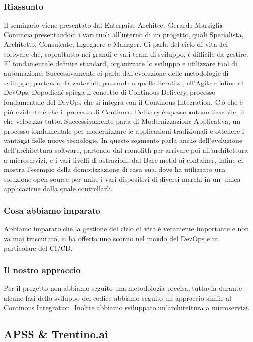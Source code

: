 \documentclass{report}
\begin{document}
\subsubsection*{Riassunto}
Il seminario viene presentato dal Enterprise Architect Gerardo Marsiglia
Comincia presentandoci i vari ruoli all'interno di un progetto, quali Specialista, Architetto, Consulente, Ingegnere e Manager.
Ci parla del ciclo di vita del software che, soprattutto nei grandi e vari team di sviluppo, è difficile da gestire. E' fondamentale definire standard, organizzare lo sviluppo e utilizzare tool di automazione.
Successivamente ci parla dell'evoluzione delle metodologie di sviluppo, partendo da waterfall, passando a quelle iterative, all'Agile e infine al DevOps.
Dopodichè spiega il concetto di Continous Delivery, processo fondamentale del DevOps che si integra con il Continous Integration. 
Ciò che è più evidente è che il processo di Continous Delivery è spesso automatizzabile, il che velocizza tutto.
Successivamente parla di Modernizzazione Applicativa, un processo fondamentale per modernizzare le applicazioni tradizionali e ottenere i vantaggi delle nuove tecnologie.
In questo segmento parla anche dell'evoluzione dell'architettura software, partendo dal monolith per arrivare poi all'architettura a microservizi, e i vari livelli di astrazione dal Bare metal ai container.
Infine ci mostra l'esempio della domotizzazione di casa sua, dove ha utilizzato una soluzione open source per unire i vari dispositivi di diversi marchi in un' unica applicazione dalla quale controllarli.

\subsubsection*{Cosa abbiamo imparato}
Abbiamo imparato che la gestione del ciclo di vita è veramente importante e non va mai trascurato, ci ha offerto uno scorcio nel mondo del DevOps e in particolare del CI/CD.
\subsubsection*{Il nostro approccio}
Per il progetto non abbiamo seguito una metodologia precisa, tuttavia durante alcune fasi dello sviluppo del codice abbiamo seguito un approccio simile al Continous Integration.
Inoltre abbiamo sviluppato un'architettura a microservizi.

\subsection{APSS \& Trentino.ai}
\end{document}
